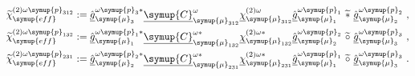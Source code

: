 \begin{subequations} \label{eq:2-213}
	\abovedisplayskip=13pt
	\belowdisplayskip=13pt
	\begin{align}
		\widetilde{\chi}^{(2)\omega\symup{p}_{312}}_{\symup{eff}} &:= \hat{\underline{g}}^{\omega\symup{p}_{3}*}_{{\symup{\mu}}_{3}} \underline{\symup{C}}^{\omega}_{{\symup{\mu}}_{312}} \underline{\chi}^{(2)\omega}_{{\symup{\mu}}_{312}} \hat{\underline{g}}^{\omega\symup{p}_{1}}_{{\symup{\mu}}_1} \ \widetilde *\ \hat{\underline{g}}^{\omega\symup{p}_{2}}_{{\symup{\mu}}_2} \label{eq:2-213a}~, \\ \widetilde{\chi}^{(2)\omega\symup{p}_{132}}_{\symup{eff}} &:= \hat{\underline{g}}^{\omega\symup{p}_{1}*}_{{\symup{\mu}}_{1}} \underline{\symup{C}}^{\omega*}_{{\symup{\mu}}_{132}} \underline{\chi}^{(2)\omega*}_{{\symup{\mu}}_{132}} \hat{\underline{g}}^{\omega\symup{p}_{2}}_{{\symup{\mu}}_2} \ \widetilde \circ\ \hat{\underline{g}}^{\omega\symup{p}_{3}}_{{\symup{\mu}}_3} \label{eq:2-213b}~, \\ \widetilde{\chi}^{(2)\omega\symup{p}_{231}}_{\symup{eff}} &:= \hat{\underline{g}}^{\omega\symup{p}_{2}*}_{{\symup{\mu}}_{2}} \underline{\symup{C}}^{\omega*}_{{\symup{\mu}}_{231}} \underline{\chi}^{(2)\omega*}_{{\symup{\mu}}_{231}} \hat{\underline{g}}^{\omega\symup{p}_{1}}_{{\symup{\mu}}_1} \ \widetilde \circ\ \hat{\underline{g}}^{\omega\symup{p}_{3}}_{{\symup{\mu}}_3} \label{eq:2-213c}~.
	\end{align}
\end{subequations}

